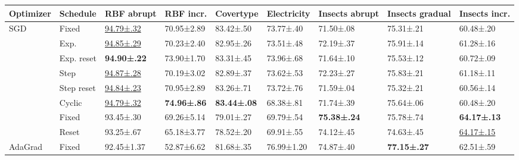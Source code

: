 \documentclass[letterpaper]{article} %
\begin{document}
\begin{table}
	\centering
	\small
	\begin{tabular}{lllllllll}
		\toprule
		Optimizer                & Schedule   & RBF abrupt             & RBF incr.           & Covertype           & Electricity         & Insects abrupt      & Insects gradual       & Insects incr.         \\
		\midrule
		\multirow[c]{8}{*}{SGD}  & Fixed      & \underline{94.79±.32}  & 70.95±2.89          & 83.42±.50           & 73.77±.40           & 71.50±.08           & 75.31±.21             & 60.48±.20             \\
		                         & Exp.       & \underline {94.85±.29} & 70.23±2.40          & 82.95±.26           & 73.51±.48           & 72.19±.37           & 75.91±.14             & 61.28±.16             \\
		                         & Exp. reset & \bfseries 94.90±.22    & 73.90±1.70          & 83.31±.45           & 73.96±.68           & 71.64±.10           & 75.53±.12             & 60.72±.09             \\
		                         & Step       & \underline{94.87±.28}  & 70.19±3.02          & 82.89±.37           & 73.62±.53           & 72.23±.27           & 75.83±.21             & 61.18±.11             \\
		                         & Step reset & \underline{94.84±.23}  & 70.95±2.89          & 83.26±.71           & 73.72±.76           & 71.59±.04           & 75.32±.21             & 60.56±.14             \\
		                         & Cyclic     & \underline{94.79±.32}  & \bfseries 74.96±.86 & \bfseries 83.44±.08 & 68.38±.81           & 71.74±.39           & 75.64±.06             & 60.48±.20             \\ \midrule
		\multirow[c]{2}{*}{Adam} & Fixed      & 93.45±.30              & 69.26±5.14          & 79.01±.27           & 69.79±.54           & \bfseries 75.38±.24 & 75.78±.74             & \bfseries 64.17±.13   \\
		                         & Reset      & 93.25±.67              & 65.18±3.77          & 78.52±.20           & 69.91±.55           & 74.12±.45           & 74.63±.45             & \underline{64.17±.15} \\ \midrule
		AdaGrad                  & Fixed      & 92.45±1.37             & 52.87±6.62          & 81.68±.35           & 76.99±1.20          & 74.87±.40           & \bfseries 77.15±.27   & 62.51±.59             \\

\end{tabular}
\end{table}
\end{document}
